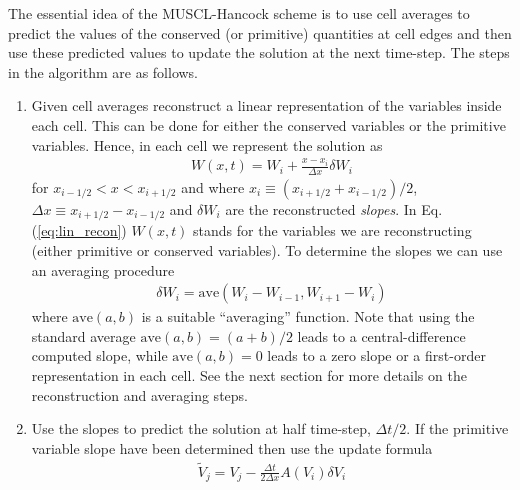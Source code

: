 \documentclass[11pt, reqno]{amsart}
\newcommand{\eqr}[1]{Eq.\thinspace(#1)}
\theoremstyle{definition}
\begin{document}
The essential idea of the MUSCL-Hancock scheme is to use cell averages
to predict the values of the conserved (or primitive) quantities at
cell edges and then use these predicted values to update the solution
at the next time-step. The steps in the algorithm are as follows.
\begin{enumerate}
\item Given cell averages reconstruct a linear representation of the
  variables inside each cell. This can be done for either the
  conserved variables or the primitive variables. Hence, in each cell
  we represent the solution as
  \begin{align}
    W(x,t) = W_i + \frac{x-x_i}{\Delta x}\delta W_i \label{eq:lin_recon}
  \end{align}
  for $x_{i-1/2}<x<x_{i+1/2}$ and where $x_i \equiv
  (x_{i+1/2}+x_{i-1/2})/2$, $\Delta x \equiv x_{i+1/2}-x_{i-1/2}$ and
  $\delta W_i$ are the reconstructed \emph{slopes}. In
  \eqr{\ref{eq:lin_recon}} $W(x,t)$ stands for the variables we are
  reconstructing (either primitive or conserved variables). To
  determine the slopes we can use an averaging procedure
  \begin{align}
    \delta W_i = \mathrm{ave}(W_i-W_{i-1}, W_{i+1}-W_i)
  \end{align}
  where $\mathrm{ave}(a, b)$ is a suitable ``averaging''
  function. Note that using the standard average $\mathrm{ave}(a, b) =
  (a+b)/2$ leads to a central-difference computed slope, while
  $\mathrm{ave}(a, b) = 0$ leads to a zero slope or a first-order
  representation in each cell. See the next section for more details
  on the reconstruction and averaging steps.
  
\item Use the slopes to predict the solution at half time-step,
  $\Delta t/2$. If the primitive variable slope have been determined
  then use the update formula
  \begin{align}
    \tilde{V}_j = V_j -\frac{\Delta t}{2 \Delta x} A(V_i) \delta V_i
  \end{align}

\end{enumerate}
\end{document}
